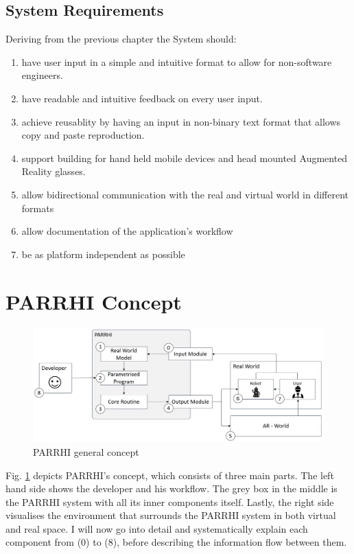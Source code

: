 \subsection{System Requirements}\label{Section:SystemRequirements}
Deriving from the previous chapter the System should:
\begin{enumerate}
	\setlength\itemsep{-1em}
	\item have user input in a simple and intuitive format to allow for non-software engineers.
	\item have readable and intuitive feedback on every user input.
	\item achieve reusablity by having an input in non-binary text format that allows copy and paste reproduction.
	\item support building for hand held mobile devices and head mounted Augmented Reality glasses.
	\item allow bidirectional communication with the real and virtual world in different formats
	\item allow documentation of the application's workflow
	\item be as platform independent as possible
\end{enumerate}

\clearpage
\section{PARRHI Concept}

\begin{figure}[h]
	\centering
	\includegraphics[width=1\textwidth]{Figures/PARRHIConcept03.jpg}
	\caption{PARRHI general concept}
	\label{Fig:PARRHIConcept}
\end{figure}

Fig. \ref{Fig:PARRHIConcept} depicts PARRHI's concept, which consists of three main parts. The left hand side shows the developer and his workflow. The grey box in the middle is the PARRHI system with all its inner components itself. Lastly, the right side visualises the environment that surrounds the PARRHI system in both virtual and real space. I will now go into detail and systematically explain each component from (0) to (8), before describing the information flow between them.

